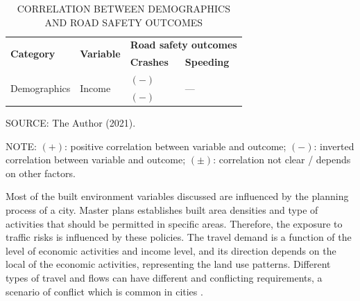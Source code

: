 \begin{table}[!hbtp]
    \footnotesize
    \captionsetup{justification=raggedright,
        singlelinecheck=false,
        font=footnotesize}
    \caption{CORRELATION BETWEEN DEMOGRAPHICS AND ROAD SAFETY OUTCOMES}
    \centering
    \begin{tabular}{llll}
        \hline
        \multirow{2}{*}{\textbf{Category}} & \multirow{2}{*}{\textbf{Variable}} & \multicolumn{2}{c}{\textbf{Road safety outcomes}} \\
         &  & \textbf{Crashes} & \textbf{Speeding} \\ \hline
        \multirow{2}{*}{Demographics} & \multirow{2}{*}{Income} & $(-)$ \textcite{Obelheiro2019} & \multirow{2}{*}{---} \\
         &  & $(-)$ \textcite{Marshall2017} &  \\ \hline
    \end{tabular}
    \label{tab:demographics}
    \par \vspace{2mm} \footnotesize \raggedright
    SOURCE: The Author (2021).
    \par \vspace{1mm} \footnotesize \raggedright
    NOTE: $(+)$: positive correlation between variable and outcome; $(-)$: inverted correlation between variable and outcome; $(\pm)$: correlation not clear / depends on other factors.
\end{table}








Most of the built environment variables discussed are influenced by the planning process of a city. Master plans establishes built area densities and type of activities that should be permitted in specific areas. Therefore, the exposure to traffic risks is influenced by these policies. The travel demand is a function of the level of economic activities and income level, and its direction depends on the local of the economic activities, representing the land use patterns. Different types of travel and flows can have different and conflicting requirements, a scenario of conflict which is common in cities \cite{Tiwari}.

